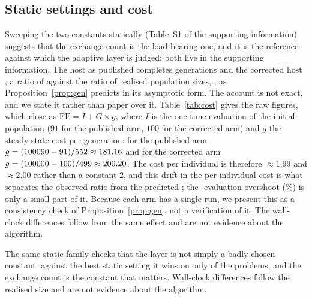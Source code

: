 \documentclass{SCIS2026}
\begin{document}
\subsection{Static settings and cost}
\label{sec:static}
Sweeping the two constants statically (Table~S1 of the supporting information) suggests that the exchange count is the load-bearing one, and it is the reference against which the adaptive layer is judged; both live in the supporting information. The host as published completes \genHost{} generations and the corrected host \genFix{}, a ratio of \genRatio{} against the ratio of realised population sizes, \popRatio{}, as Proposition~\ref{prop:gen} predicts in its asymptotic form. The account is not exact, and we state it rather than paper over it. Table~\ref{tab:cost} gives the raw figures, which close as $\mathrm{FE} = I + G\times g$, where $I$ is the one-time evaluation of the initial population ($91$ for the published arm, $100$ for the corrected arm) and $g$ the steady-state cost per generation: for the published arm $g=(100090{}-91)/552{}\approx181.16$ and for the corrected arm $g=(100000{}-100)/499{}\approx200.20$. The cost per individual is therefore $\approx1.99$ and $\approx2.00$ rather than a constant $2$, and this drift in the per-individual cost is what separates the observed ratio \genRatio{} from the predicted \popRatio{}; the \feOver{}-evaluation overshoot (\feOverPct\%) is only a small part of it. Because each arm has a single run, we present this as a consistency check of Proposition~\ref{prop:gen}, not a verification of it. The wall-clock differences follow from the same effect and are not evidence about the algorithm.

The same static family checks that the layer is not simply a badly chosen constant: against the best static setting it wins on only \layerBeatsStaticN{} of the \nProbs{} problems, and the exchange count is the constant that matters. Wall-clock differences follow the realised size and are not evidence about the algorithm.

\begin{table}[!t]
\centering
\footnotesize
\caption{Population, evaluations, generations and wall-clock time of the two arms of Section~\ref{sec:abc}. ``FE / generation'' is the steady-state evaluations per generation, computed as $(\text{evaluations}-I)/\text{generations}$ with $I$ the one-time evaluation of the initial population ($I=91$ and $100$), so each row closes as $\mathrm{FE}=I+\text{generations}\times(\mathrm{FE}/\text{generation})$. The $K$ sweep (Table~S2) is recorded at exactly $\budget$ evaluations per run and is reported in the supporting information}
\label{tab:cost}

\end{table}
\end{document}
